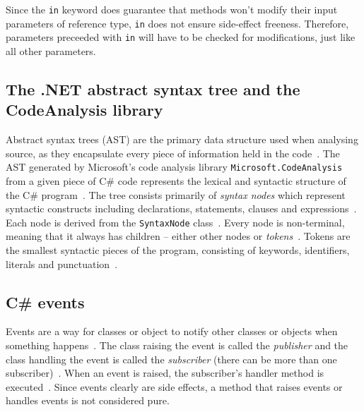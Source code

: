 \documentclass[a4paper,12pt]{article}
\begin{document}
Since the \texttt{in} keyword does guarantee that methods won't modify their input parameters of reference type, \texttt{in} does not ensure side-effect freeness. Therefore, parameters preceeded with \texttt{in} will have to be checked for modifications, just like all other parameters.

\subsection{The .NET abstract syntax tree and the CodeAnalysis library} \label{The .NET Abstract Syntax Tree and the CodeAnalysis library}

Abstract syntax trees (AST) are the primary data structure used when analysing source, as they encapsulate every piece of information held in the code~\cite{microsoft-work-with-syntax}. The AST generated by Microsoft's code analysis library \texttt{Microsoft.CodeAnalysis} from a given piece of C\# code represents the lexical and syntactic structure of the C\# program~\cite{microsoft-work-with-syntax}. The tree consists primarily of \textit{syntax nodes} which represent syntactic constructs including declarations, statements, clauses and expressions~\cite{microsoft-work-with-syntax}. Each node is derived from the \texttt{SyntaxNode} class~\cite{microsoft-work-with-syntax}. Every node is non-terminal, meaning that it always has children -- either other nodes or \textit{tokens}~\cite{microsoft-work-with-syntax}. Tokens are the smallest syntactic pieces of the program, consisting of keywords, identifiers, literals and punctuation~\cite{microsoft-work-with-syntax}.


\subsection{C\# events} \label{sub:Events}

Events are a way for classes or object to notify other classes or objects when something happens~\cite{microsoft-events}. The class raising the event is called the \textit{publisher} and the class handling the event is called the \textit{subscriber} (there can be more than one subscriber)~\cite{microsoft-events}. When an event is raised, the subscriber's handler method is executed~\cite{microsoft-events}. Since events clearly are side effects, a method that raises events or handles events is not considered pure.
\end{document}
